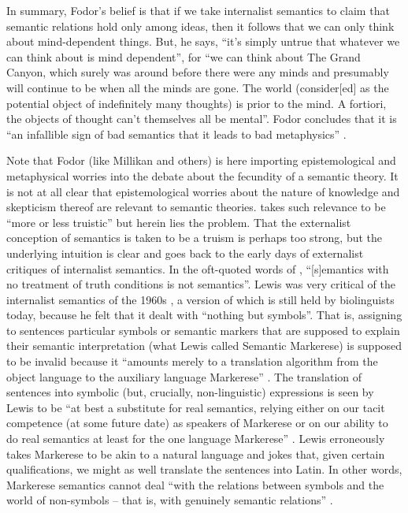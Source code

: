 In summary, Fodor’s belief is that if we take internalist semantics to claim that semantic relations hold only among ideas, then it follows that we can only think about mind-dependent things. But, he says, “it’s simply untrue that whatever we can think about is mind dependent”, for “we can think about The Grand Canyon, which surely was around before there were any minds and presumably will continue to be when all the minds are gone. The world (consider[ed] as the potential object of indefinitely many thoughts) is prior to the mind. A fortiori, the objects of thought can’t themselves all be mental”. Fodor concludes that it is “an infallible sign of bad semantics that it leads to bad metaphysics” \citep[8]{Fodor2007}.

Note that Fodor (like Millikan and others) is here importing epistemological and metaphysical worries into the debate about the fecundity of a semantic theory. It is not at all clear that epistemological worries about the nature of knowledge and skepticism thereof are relevant to semantic theories. \citet[6]{Fodor2007} takes such relevance to be “more or less truistic” but herein lies the problem. That the externalist conception of semantics is taken to be a truism is perhaps too strong, but the underlying intuition is clear and goes back to the early days of externalist critiques of internalist semantics. In the oft-quoted words of \citet[18]{Lewis1970}, “[s]emantics with no treatment of truth conditions is not semantics”. Lewis was very critical of the internalist semantics of the 1960s \citep{KatzFodor1963,KatzPostal1964}, a version of which is still held by biolinguists today, because he felt that it dealt with “nothing but symbols”. That is, assigning to sentences particular symbols or semantic markers that are supposed to explain their semantic interpretation (what Lewis called Semantic Markerese) is  supposed to be invalid because it “amounts merely to a translation algorithm from the object language to the auxiliary language Markerese” \citep[18]{Lewis1970}. The translation of sentences into symbolic (but, crucially, non-linguistic) expressions is seen by Lewis to be “at best a substitute for real semantics, relying either on our tacit competence (at some future date) as speakers of Markerese or on our ability to do real semantics at least for the one language Markerese” \citep[18]{Lewis1970}. Lewis erroneously takes Markerese to be akin to a natural language and jokes that, given certain qualifications, we might as well translate the sentences into Latin. In other words, Markerese semantics cannot deal “with the relations between symbols and the world of non-symbols – that is, with genuinely semantic relations” \citep[19]{Lewis1970}.

